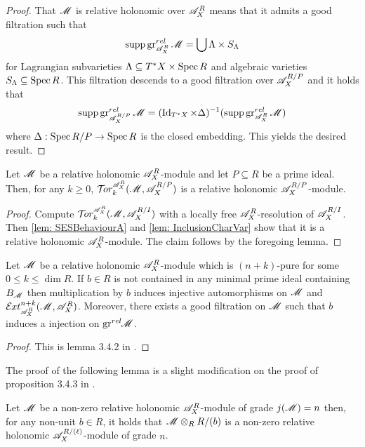 \begin{proof}
  That $\mathscr{M}$ is relative holonomic over $\mathscr{A}_X^{R}$ means that it admits a good filtration such that
  $$\operatorname{supp} \operatorname{gr}_{\mathscr{A}_X^R}^{rel} \mathscr{M}  = \bigcup \Lambda \times S_\Lambda $$
  for Lagrangian subvarieties $\Lambda \subseteq T^* X \times \operatorname{Spec} R$ and algebraic varieties $S_\Lambda \subseteq \operatorname{Spec} R$.
  This filtration descends to a good filtration over $\mathscr{A}_{X}^{R/P}$ and it holds that
  $$\operatorname{supp} \operatorname{gr}_{\mathscr{A}_X^{R/P}}^{rel}\mathscr{M} = (\operatorname{Id}_{T^*X} \times \Delta)^{-1}(\operatorname{supp} \operatorname{gr}_{\mathscr{A}_X^R}^{rel}\mathscr{M})$$
  where $\Delta:\operatorname{Spec} R/P\to \operatorname{Spec} R$ is the closed embedding.
  This yields the desired result.
\end{proof}
\begin{lemma}\label{lem: TorRelHol}
  Let $\mathscr{M}$ be a relative holonomic $\mathscr{A}_X^R$-module and let $P\subseteq R$ be a prime ideal. Then, for any $k\geq 0$, $\Tr{\A_X^R}{k}(\M, \A_X^{R/P})$ is a relative holonomic $\mathscr{A}_X^{R/P}$-module.
 \end{lemma}
\begin{proof}
  Compute $\Tr{\A_X^R}{k}(\M, \A_X^{R/I})$ with a locally free $\mathscr{A}_X^R$-resolution of $\mathscr{A}_X^{R/I}$.
  Then \cref{lem: SESBehaviourA} and \cref{lem: InclusionCharVar} show that it is a relative holonomic $\mathscr{A}_X^R$-module.
  The claim follows by the foregoing lemma.
\end{proof}
\begin{lemma}\label{lem: NotBernsteinInjectiveAutomorphism}
  Let $\mathscr{M}$ be a relative holonomic $\mathscr{A}_X^R$-module which is $(n+k)$-pure for some $0\leq k \leq \dim R$. If $b\in R$ is not contained in any minimal prime ideal containing $B_{\mathscr{M}}$ then multiplication by $b$ induces injective automorphisms on $\mathscr{M}$ and $\Ex{\A_X^R}{n+k}(\M,\A_X^R)$. Moreover, there exists a good filtration on $\mathscr{M}$ such that $b$ induces a injection on $\operatorname{gr}^{rel}\mkern-5mu \mathscr{M}$.
\end{lemma}
\begin{proof}
  This is lemma 3.4.2 in \cite{budur2019zero}.
\end{proof}
The proof of the following lemma is a slight modification on the proof of proposition 3.4.3 in \cite{budur2019zero}.
\begin{lemma}\label{lem: RestrictToCM}
  Let $\mathscr{M}$ be a non-zero relative holonomic $\mathscr{A}_X^R$-module of grade $j(\mathscr{M}) = n$  then, for any non-unit $b\in R$, it holds that $\mathscr{M} \otimes_R R/(b)$ is a non-zero relative holonomic  $\mathscr{A}_X^{R/(\ell)}$-module of grade $n$.
\end{lemma}
